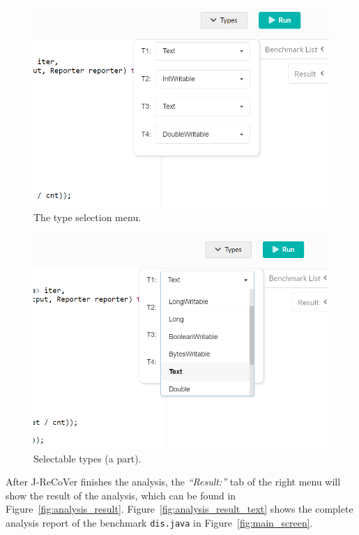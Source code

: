 \begin{figure}
\begin{center}
\includegraphics[width=.8\linewidth]{screenshots/type_select_menu}
\caption{The type selection menu.}
\label{fig:type_select_menu}
\end{center}
\end{figure}

\begin{figure}
\begin{center}
\includegraphics[width=.8\linewidth]{screenshots/selectable_types}
\caption{Selectable types (a part).}
\label{fig:selectable_types}
\end{center}
\end{figure}

After J-ReCoVer finishes the analysis, the \emph{``Result:''} tab of the right
menu will show the result of the analysis, which can be found in
Figure~\ref{fig:analysis_result}. Figure~\ref{fig:analysis_result_text} shows
the complete analysis report of the benchmark \texttt{dis.java} in
Figure~\ref{fig:main_screen}.

